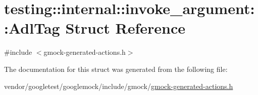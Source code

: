 \hypertarget{structtesting_1_1internal_1_1invoke__argument_1_1_adl_tag}{}\section{testing\+:\+:internal\+:\+:invoke\+\_\+argument\+:\+:Adl\+Tag Struct Reference}
\label{structtesting_1_1internal_1_1invoke__argument_1_1_adl_tag}


{\ttfamily \#include $<$gmock-\/generated-\/actions.\+h$>$}



The documentation for this struct was generated from the following file\+:\begin{DoxyCompactItemize}
\item 
vendor/googletest/googlemock/include/gmock/\hyperlink{gmock-generated-actions_8h}{gmock-\/generated-\/actions.\+h}\end{DoxyCompactItemize}
